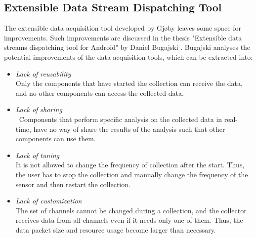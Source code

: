 \subsection{Extensible Data Stream Dispatching Tool}
The extensible data acquisition tool developed by Gjøby leaves some space for improvements. Such improvements are discussed in the thesis "Extensible data streams dispatching tool for Android" by Daniel Bugajski \cite{daniel}. Bugajski analyses the potential improvements of the data acquisition tools, which can be extracted into:
\begin{itemize}
    \item \textit{Lack of reusability} \\ Only the components that have started the collection can receive the data, and no other components can access the collected data.
    \item \textit{Lack of sharing} \\ Components that perform specific analysis on the collected data in real-time, have no way of share the results of the analysis such that other components can use them. 
    \item \textit{Lack of tuning} \\ It is not allowed to change the frequency of collection after the start. Thus, the user has to stop the collection and manually change the frequency of the sensor and then restart the collection. 
    \item \textit{Lack of customization} \\ The set of channels cannot be changed during a collection, and the collector receives data from all channels even if it needs only one of them. Thus, the data packet size and resource usage become larger than necessary.
\end{itemize}

